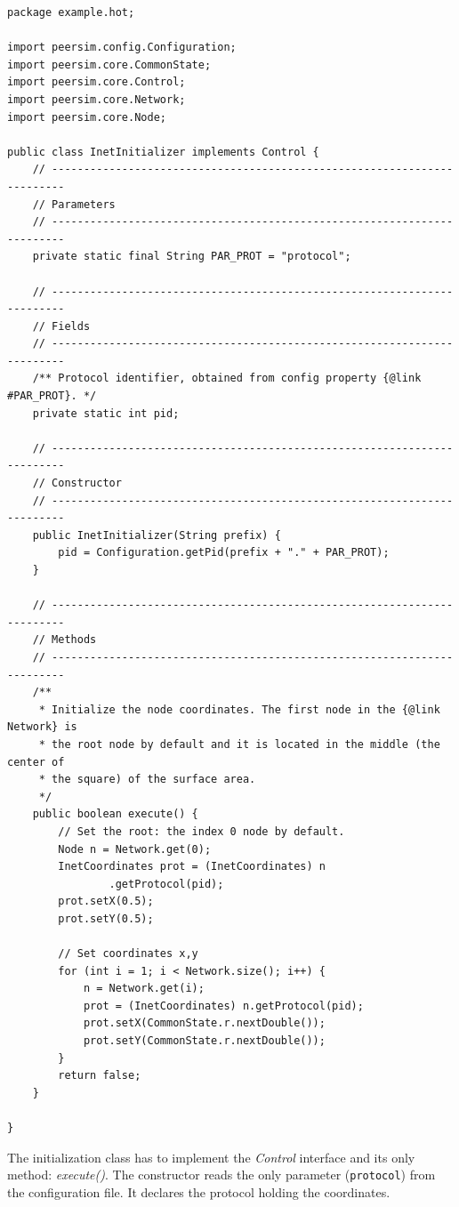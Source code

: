 \documentclass[a4paper,11pt]{article}
\begin{document}
\footnotesize
\begin{verbatim}
package example.hot;

import peersim.config.Configuration;
import peersim.core.CommonState;
import peersim.core.Control;
import peersim.core.Network;
import peersim.core.Node;

public class InetInitializer implements Control {
    // ------------------------------------------------------------------------
    // Parameters
    // ------------------------------------------------------------------------
    private static final String PAR_PROT = "protocol";

    // ------------------------------------------------------------------------
    // Fields
    // ------------------------------------------------------------------------
    /** Protocol identifier, obtained from config property {@link #PAR_PROT}. */
    private static int pid;

    // ------------------------------------------------------------------------
    // Constructor
    // ------------------------------------------------------------------------
    public InetInitializer(String prefix) {
        pid = Configuration.getPid(prefix + "." + PAR_PROT);
    }

    // ------------------------------------------------------------------------
    // Methods
    // ------------------------------------------------------------------------
    /**
     * Initialize the node coordinates. The first node in the {@link Network} is
     * the root node by default and it is located in the middle (the center of
     * the square) of the surface area.
     */
    public boolean execute() {
        // Set the root: the index 0 node by default.
        Node n = Network.get(0);
        InetCoordinates prot = (InetCoordinates) n
                .getProtocol(pid);
        prot.setX(0.5);
        prot.setY(0.5);

        // Set coordinates x,y
        for (int i = 1; i < Network.size(); i++) {
            n = Network.get(i);
            prot = (InetCoordinates) n.getProtocol(pid);
            prot.setX(CommonState.r.nextDouble());
            prot.setY(CommonState.r.nextDouble());
        }
        return false;
    }

}
\end{verbatim}
\normalsize

The initialization class has to implement the \emph{Control} interface
and its only method: \emph{execute()}. 
The constructor reads the only parameter (\texttt{protocol}) from 
the configuration
file. It declares the protocol holding the coordinates.
\end{document}
